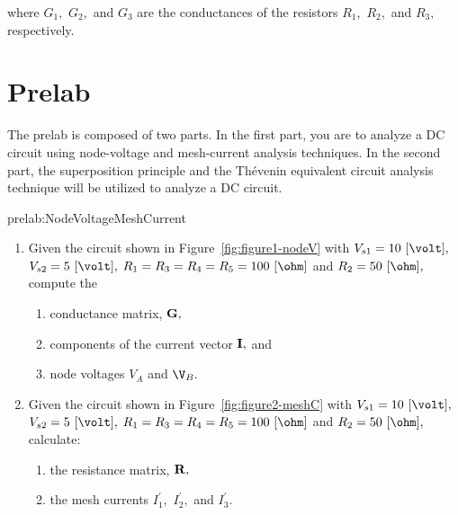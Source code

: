 %
where $G_1,$ $G_2,$ and $G_3$ are the conductances of the resistors $R_1,$ $R_2,$ and $R_3,$ respectively.  


\section{Prelab}
\label{sec:prelab}

The prelab is composed of two parts. In the first part, you are to analyze a DC circuit using node-voltage and mesh-current analysis techniques. In the second part, the superposition principle and the Th\'evenin equivalent circuit analysis technique will be utilized to analyze a DC circuit. 

\begin{prelab}{prelab:NodeVoltageMeshCurrent}
\begin{enumerate}
    \item Given the circuit shown in Figure~\ref{fig:figure1-nodeV} with $V_{s1} = 10~[\volt],$  $V_{s2} = 5~[\volt],$ $R_1 = R_3=R_4=R_5= 100~[\ohm]$ and $R_2 = 50~[\ohm],$ compute the 
     \begin{enumerate}
         \item conductance matrix, ${\bf G},$
         \item components of the current vector ${\bf I},$ and
         \item node voltages $V_A$ and $\V_B.$
     \end{enumerate}
 \item Given the circuit shown in Figure~\ref{fig:figure2-meshC} with $V_{s1} = 10~[\volt],$  $V_{s2} = 5~[\volt],$  $R_1 = R_3=R_4=R_5= 100~[\ohm]$ and $R_2 = 50~[\ohm],$ calculate: 
 \begin{enumerate}
     \item the resistance matrix, ${\bf R},$
     \item the mesh currents $I_1^{'},$ $I_2^{'},$ and $I_3^{'}.$
 \end{enumerate}
\end{enumerate}
 
\end{prelab}

